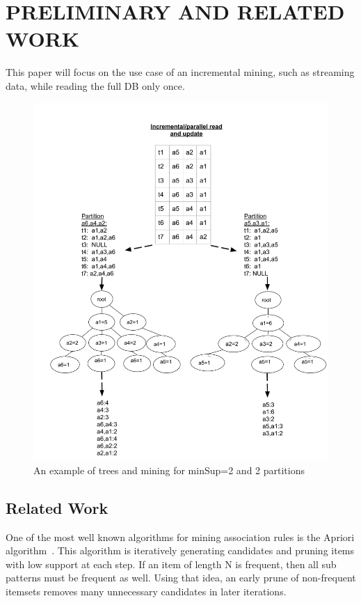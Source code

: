 \section{PRELIMINARY AND RELATED WORK}

This paper will focus on the use case of an incremental mining, such as streaming data, while reading the full DB only once.

\begin{figure}
  \centering
  \includegraphics[width=\linewidth]{figures/IncrementalTreeMining}
  \caption{An example of trees and mining for minSup=2 and 2 partitions}
  \label{fig:incrementalParallelMining}
\end{figure}

\subsection{Related Work}
  One of the most well known algorithms for mining association rules is the Apriori algorithm~\cite{agrawal1994fast}. This algorithm is iteratively generating candidates and pruning items with low support at each step. If an item of length N is frequent, then all sub patterns must be frequent as well. Using that idea, an early prune of non-frequent itemsets removes many unnecessary candidates in later iterations.

